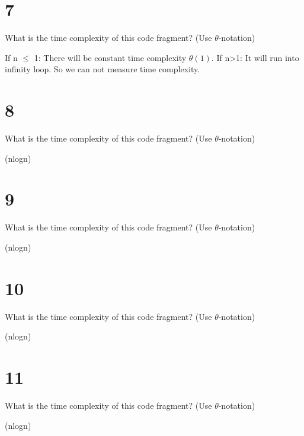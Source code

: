 \documentclass{article}
\begin{document}
\section*{7}
    \item What is the time complexity of this code fragment? (Use $\theta$-notation)
        \begin{shaded} 
        If n $\leq$ 1: There will be constant time complexity $\theta(1)$. If n>1: It will run into infinity loop. So we can not measure time complexity.
        \end{shaded}   


        
\section*{8}
    \item What is the time complexity of this code fragment? (Use $\theta$-notation)
        \begin{shaded} 
        \theta (nlogn)
        \end{shaded}     



\section*{9}
    \item What is the time complexity of this code fragment? (Use $\theta$-notation)
        \begin{shaded} 
        \theta(nlogn)
        \end{shaded}     


\section*{10}
    \item What is the time complexity of this code fragment? (Use $\theta$-notation)
        \begin{shaded} 
        \theta(nlogn)
        \end{shaded}     

\section*{11}
    \item What is the time complexity of this code fragment? (Use $\theta$-notation)
        \begin{shaded} 
        \theta (nlogn)
        \end{shaded}     
\end{document}
